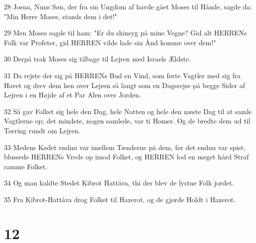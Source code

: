 \par 28 Josua, Nuns Søn, der fra sin Ungdom af havde gået Moses til Hånde, sagde da: "Min Herre Moses, stands dem i det!"
\par 29 Men Moses sagde til ham: "Er du skinsyg på mine Vegne? Gid alt HERRENs Folk var Profeter, gid HERREN vilde lade sin Ånd komme over dem!"
\par 30 Derpå trak Moses sig tilbage til Lejren med Israels Ældste.
\par 31 Da rejste der sig på HERRENs Bud en Vind, som førte Vagtler med sig fra Havet og drev dem hen over Lejren så langt som en Dagsrejse på begge Sider af Lejren i en Højde af et Par Alen over Jorden.
\par 32 Så gav Folket sig hele den Dag, hele Natten og hele den næste Dag til at samle Vagtlerne op; det mindste, nogen samlede, var ti Homer. Og de bredte dem ud til Tørring rundt om Lejren.
\par 33 Medens Kødet endnu var imellem Tænderne på dem, før det endnu var spist, blussede HERRENs Vrede op imod Folket, og HERREN lod en meget hård Straf ramme Folket.
\par 34 Og man kaldte Stedet Kibrot Hattåva, thi der blev de lystne Folk jordet.
\par 35 Fra Kibrot-Hattåva drog Folket til Hazerot, og de gjorde Holdt i Hazerot.

\chapter{12}

